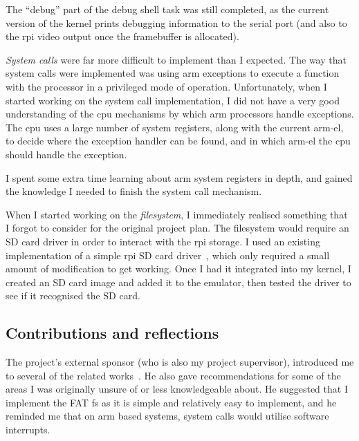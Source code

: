\documentclass{article}
\begin{document}
The ``debug'' part of the debug shell task was still completed, as the current
version of the kernel prints debugging information to the serial port (and also
to the \gls{rpi} video output once the framebuffer is allocated).

\emph{System calls} were far more difficult to implement than I expected. The
way that system calls were implemented was using \gls{arm} exceptions
to execute a function with the processor in a privileged mode of operation.
Unfortunately, when I started working on the system call implementation, I did
not have a very good understanding of the \gls{cpu} mechanisms by which
\gls{arm} processors handle exceptions. The \gls{cpu} uses a large number
of system registers, along with the current \gls{arm-el}, to decide where the
exception handler can be found, and in which \gls{arm-el} the \gls{cpu} should
handle the exception.

I spent some extra time learning about \gls{arm} system registers in depth, and
gained the knowledge I needed to finish the system call mechanism.

When I started working on the \emph{filesystem}, I immediately realised
something that I forgot to consider for the original project plan. The
filesystem would require an SD card driver in order to interact with the
\gls{rpi} storage. I used an existing implementation of a simple \gls{rpi} SD
card driver~\cite{rpi-boot-gh}, which only required a small amount of
modification to get working. Once I had it integrated into my kernel, I created
an SD card image and added it to the emulator, then tested the driver to see if
it recognised the SD card.

\subsection{Contributions and reflections}
The project's external sponsor (who is also my project supervisor), introduced
me to several of the related works~\cite{netBSD-git, riscOS-source}. He also
gave recommendations for some of the areas I was originally unsure of or less
knowledgeable about. He suggested that I implement the FAT \gls{fs} as it is
simple and relatively easy to implement, and he reminded me that on \gls{arm}
based systems, system calls would utilise software interrupts.
\end{document}
